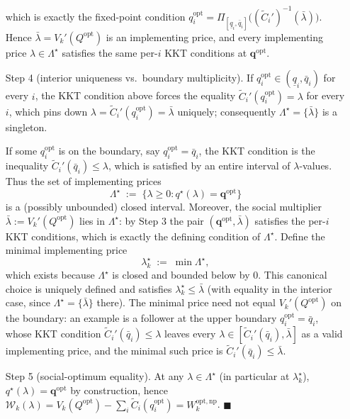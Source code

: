 \documentclass{article}
\begin{document}
\begin{enumerate}
which is exactly the fixed-point condition $q_i^{\mathrm{opt}} = \Pi_{[\underline q_i, \bar q_i]}\!\big((\widetilde C_i')^{-1}(\bar\lambda)\big)$. Hence $\bar\lambda = V_k'(Q^{\mathrm{opt}})$ is an implementing price, and every implementing price $\lambda \in \Lambda^\star$ satisfies the same per-$i$ KKT conditions at $\mathbf q^{\mathrm{opt}}$.
    \item[Step 4] (interior uniqueness vs.\ boundary multiplicity). If $q_i^{\mathrm{opt}} \in (\underline q_i, \bar q_i)$ for every $i$, the KKT condition above forces the equality $\widetilde C_i'(q_i^{\mathrm{opt}}) = \lambda$ for every $i$, which pins down $\lambda = \widetilde C_i'(q_i^{\mathrm{opt}}) = \bar\lambda$ uniquely; consequently $\Lambda^\star = \{\bar\lambda\}$ is a singleton.

If some $q_i^{\mathrm{opt}}$ is on the boundary, say $q_i^{\mathrm{opt}} = \bar q_i$, the KKT condition is the inequality $\widetilde C_i'(\bar q_i) \le \lambda$, which is satisfied by an entire interval of $\lambda$-values. Thus the set of implementing prices
$$\Lambda^\star \;:=\; \big\{\lambda \ge 0 : q^\star(\lambda) = \mathbf q^{\mathrm{opt}}\big\}$$
is a (possibly unbounded) closed interval. Moreover, the social multiplier $\bar\lambda := V_k'(Q^{\mathrm{opt}})$ lies in $\Lambda^\star$: by Step 3 the pair $(\mathbf q^{\mathrm{opt}}, \bar\lambda)$ satisfies the per-$i$ KKT conditions, which is exactly the defining condition of $\Lambda^\star$. Define the minimal implementing price
$$\lambda_k^\star \;:=\; \min \Lambda^\star,$$
which exists because $\Lambda^\star$ is closed and bounded below by $0$. This canonical choice is uniquely defined and satisfies $\lambda_k^\star \le \bar\lambda$ (with equality in the interior case, since $\Lambda^\star = \{\bar\lambda\}$ there). The minimal price need not equal $V_k'(Q^{\mathrm{opt}})$ on the boundary: an example is a follower at the upper boundary $q_i^{\mathrm{opt}} = \bar q_i$, whose KKT condition $\widetilde C_i'(\bar q_i) \le \lambda$ leaves every $\lambda \in [\widetilde C_i'(\bar q_i), \bar\lambda]$ as a valid implementing price, and the minimal such price is $\widetilde C_i'(\bar q_i) \le \bar\lambda$.
    \item[Step 5] (social-optimum equality). At any $\lambda \in \Lambda^\star$ (in particular at $\lambda_k^\star$), $q^\star(\lambda) = \mathbf q^{\mathrm{opt}}$ by construction, hence $\mathcal W_k(\lambda) = V_k(Q^{\mathrm{opt}}) - \sum_i \widetilde C_i(q_i^{\mathrm{opt}}) = W^{\mathrm{opt,np}}_k$. $\blacksquare$
\end{enumerate}
\end{document}
